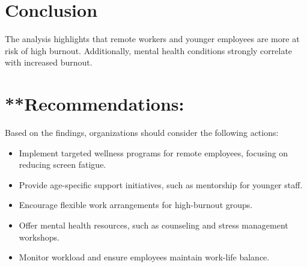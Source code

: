 \documentclass[
]{article}
\providecommand{\tightlist}{%
  \setlength{\itemsep}{0pt}\setlength{\parskip}{0pt}}
\begin{document}
\section{\texorpdfstring{\textbf{Conclusion}}{Conclusion}}\label{conclusion}

The analysis highlights that remote workers and younger employees are
more at risk of high burnout. Additionally, mental health conditions
strongly correlate with increased burnout.

\section{**Recommendations:}\label{recommendations}

Based on the findings, organizations should consider the following
actions:

\begin{itemize}
\tightlist
\item
  Implement targeted wellness programs for remote employees, focusing on
  reducing screen fatigue.
\item
  Provide age-specific support initiatives, such as mentorship for
  younger staff.
\item
  Encourage flexible work arrangements for high-burnout groups.
\item
  Offer mental health resources, such as counseling and stress
  management workshops.
\item
  Monitor workload and ensure employees maintain work-life balance.
\end{itemize}
\end{document}
